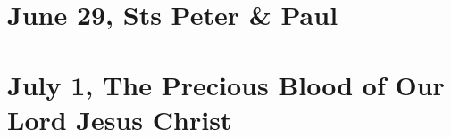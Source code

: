 {{
\bigskip
\benedicamusdomino{}
}

{
\section{June 29, Sts Peter \& Paul}
\subtitle{ Class}
\subtitle{I \& II Vespers}

\def\definevesperspropers{
  \def\prepsalmfive{\greseteolcustos{manual}}
}
\def\definevesperspropersalt{}
\def\vesperspropersnote{At II Vespers:}
\def\vesperspropersaltnote{At I Vespers:}
\def\prevesperspsalms{\noindent\printnote{Continue to the chapter on page \pageref{june29-chapter}.\\}}
\def\vesperspsalmslabel{\label{june29-2vespers}}
\def\prevesperspsalmsalt{\noindent\printnote{For II Vespers psalms and antiphons, go to page \pageref{june29-2vespers}.}}
\def\prechapter{\label{june29-chapter}}
\def\premagverses{\greseteolcustos{manual}}
\def\printfullhymn{
  {\printhymn{\oldstylenums{\hymnlinetwo}}{\hymninitial}{\hymntex}{\hymntranslation}}
  {
    \def\vrlinebreak{T}
    \oldneedspace{3\baselineskip}
    \printnote{\vesperspropersaltnote}
    \definevesperspropersalt
    \printvr[\greseteolcustos{manual}]{\vrtex}{\vtranslation}{\rtranslation}
  }
  \bigskip
  {
    \def\vrlinebreak{T}
    \oldneedspace{3\baselineskip}
    \printnote{\vesperspropersnote}
    \definevesperspropers
    \printvr[\greseteolcustos{manual}]{\vrtex}{\vtranslation}{\rtranslation}
  }
}

\bigskip
\benedicamusdomino{}
}

{
\section{July 1, The Precious Blood of Our Lord Jesus Christ}
\subtitle{ Class}
\subtitle{I \& II Vespers}

\def\definevesperspropers{
  \def\prepsalmfive{\greseteolcustos{manual}}
}
\def\definevesperspropersalt{}
\def\vesperspropersnote{At II Vespers:}
\def\vesperspropersaltnote{At I Vespers:}
\def\premagverses{\greseteolcustos{manual}}
\def\printfullhymn{
  {\printhymn{\oldstylenums{\hymnlinetwo}}{\hymninitial}{\hymntex}{\hymntranslation}}
  {
    \def\vrlinebreak{T}
    \oldneedspace{3\baselineskip}
    \printnote{\vesperspropersaltnote}
    \definevesperspropersalt
    \printvr[\greseteolcustos{manual}]{\vrtex}{\vtranslation}{\rtranslation}
  }
  \bigskip
  {
    \def\vrlinebreak{T}
    \oldneedspace{3\baselineskip}
    \printnote{\vesperspropersnote}
    \definevesperspropers
    \printvr[\greseteolcustos{manual}]{\vrtex}{\vtranslation}{\rtranslation}
  }
}

}}
